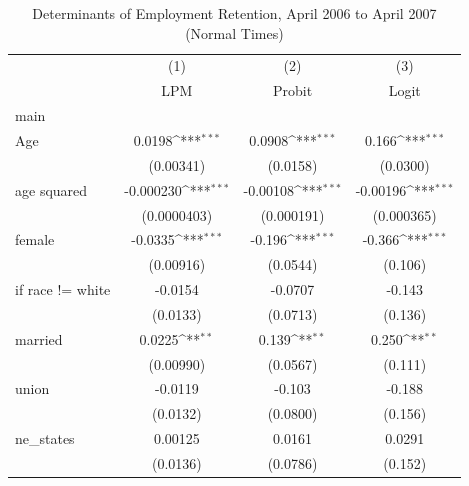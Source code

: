 \begin{table}[htbp]\centering
\def\sym#1{\ifmmode^{#1}\else\(^{#1}\)\fi}
\caption{Determinants of Employment Retention, April 2006 to April 2007 (Normal Times)\label{tab:prob1-parth}}
\begin{tabular}{l*{3}{c}}
\toprule
                    &\multicolumn{1}{c}{(1)}&\multicolumn{1}{c}{(2)}&\multicolumn{1}{c}{(3)}\\
                    &\multicolumn{1}{c}{LPM}&\multicolumn{1}{c}{Probit}&\multicolumn{1}{c}{Logit}\\
\midrule
main                &                     &                     &                     \\
Age                 &      0.0198\sym{***}&      0.0908\sym{***}&       0.166\sym{***}\\
                    &   (0.00341)         &    (0.0158)         &    (0.0300)         \\
\addlinespace
age squared         &   -0.000230\sym{***}&    -0.00108\sym{***}&    -0.00196\sym{***}\\
                    & (0.0000403)         &  (0.000191)         &  (0.000365)         \\
\addlinespace
female              &     -0.0335\sym{***}&      -0.196\sym{***}&      -0.366\sym{***}\\
                    &   (0.00916)         &    (0.0544)         &     (0.106)         \\
\addlinespace
=1 if race != white &     -0.0154         &     -0.0707         &      -0.143         \\
                    &    (0.0133)         &    (0.0713)         &     (0.136)         \\
\addlinespace
married             &      0.0225\sym{**} &       0.139\sym{**} &       0.250\sym{**} \\
                    &   (0.00990)         &    (0.0567)         &     (0.111)         \\
\addlinespace
union               &     -0.0119         &      -0.103         &      -0.188         \\
                    &    (0.0132)         &    (0.0800)         &     (0.156)         \\
\addlinespace
ne\_states           &     0.00125         &      0.0161         &      0.0291         \\
                    &    (0.0136)         &    (0.0786)         &     (0.152)         \\

\end{tabular}
\end{table}
